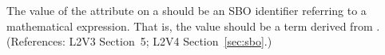 The value of the  attribute on a \Delay should be an SBO
identifier referring to a mathematical expression.  That is, the value
should be a term derived from \sbomathformula.  (References: 
L2V3 Section~5; L2V4 Section~\ref{sec:sbo}.)
